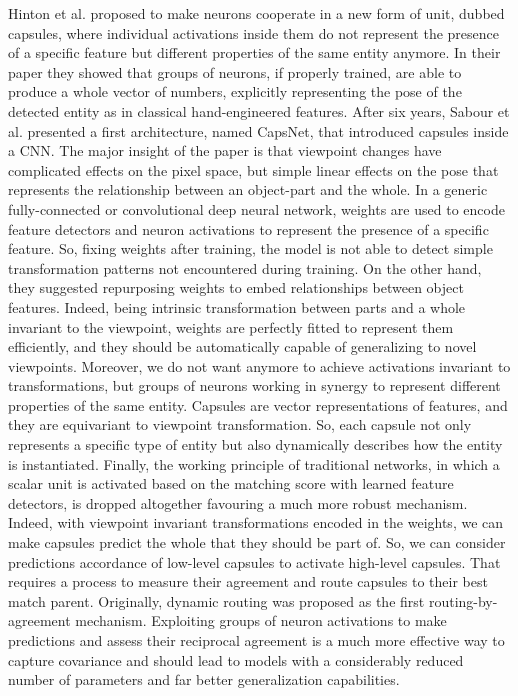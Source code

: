 \documentclass{article}
\begin{document}
Hinton et al.\cite{hinton2011transforming} proposed to make neurons cooperate in a new form of unit, dubbed capsules, where individual activations inside them do not represent the presence of a specific feature but different properties of the same entity anymore. In their paper they showed that groups of neurons, if properly trained, are able to produce a whole vector of numbers, explicitly representing the pose of the detected entity as in classical hand-engineered features\cite{lowe1999object}. After six years, Sabour et al. \cite{sabour2017dynamic} presented a first architecture, named CapsNet, that introduced capsules inside a CNN. The major insight of the paper is that viewpoint changes have complicated effects on the pixel space, but simple linear effects on the pose that represents the relationship between an object-part and the whole. In a generic fully-connected or convolutional deep neural network, weights are used to encode feature detectors and neuron activations to represent the presence of a specific feature. So, fixing weights after training, the model is not able to detect simple transformation patterns not encountered during training. On the other hand, they suggested repurposing weights to embed relationships between object features. Indeed, being intrinsic transformation between parts and a whole invariant to the viewpoint, weights are perfectly fitted to represent them efficiently, and they should be automatically capable of generalizing to novel viewpoints. Moreover, we do not want anymore to achieve activations invariant to transformations, but groups of neurons working in synergy to represent different properties of the same entity. Capsules are vector representations of features, and they are equivariant to viewpoint transformation. So, each capsule not only represents a specific type of entity but also dynamically describes how the entity is instantiated. Finally, the working principle of traditional networks, in which a scalar unit is activated based on the matching score with learned feature detectors, is dropped altogether favouring a much more robust mechanism. Indeed, with viewpoint invariant transformations encoded in the weights, we can make capsules predict the whole that they should be part of. So, we can consider predictions accordance of low-level capsules to activate high-level capsules. That requires a process to measure their agreement and route capsules to their best match parent. Originally, dynamic routing was proposed as the first routing-by-agreement mechanism.  Exploiting groups of neuron activations to make predictions and assess their reciprocal agreement is a much more effective way to capture covariance and should lead to models with a considerably reduced number of parameters and far better generalization capabilities.
\end{document}
